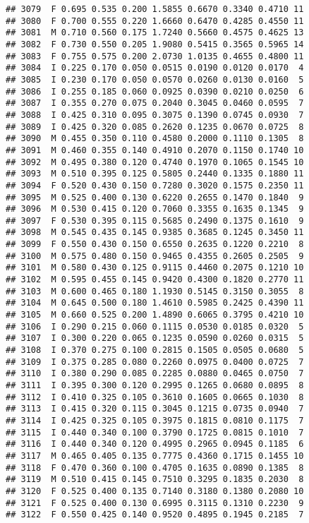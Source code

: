 \documentclass[
]{article}
\begin{document}
\begin{verbatim}
## 3079  F 0.695 0.535 0.200 1.5855 0.6670 0.3340 0.4710 11
## 3080  F 0.700 0.555 0.220 1.6660 0.6470 0.4285 0.4550 11
## 3081  M 0.710 0.560 0.175 1.7240 0.5660 0.4575 0.4625 13
## 3082  F 0.730 0.550 0.205 1.9080 0.5415 0.3565 0.5965 14
## 3083  F 0.755 0.575 0.200 2.0730 1.0135 0.4655 0.4800 11
## 3084  I 0.225 0.170 0.050 0.0515 0.0190 0.0120 0.0170  4
## 3085  I 0.230 0.170 0.050 0.0570 0.0260 0.0130 0.0160  5
## 3086  I 0.255 0.185 0.060 0.0925 0.0390 0.0210 0.0250  6
## 3087  I 0.355 0.270 0.075 0.2040 0.3045 0.0460 0.0595  7
## 3088  I 0.425 0.310 0.095 0.3075 0.1390 0.0745 0.0930  7
## 3089  I 0.425 0.320 0.085 0.2620 0.1235 0.0670 0.0725  8
## 3090  M 0.455 0.350 0.110 0.4580 0.2000 0.1110 0.1305  8
## 3091  M 0.460 0.355 0.140 0.4910 0.2070 0.1150 0.1740 10
## 3092  M 0.495 0.380 0.120 0.4740 0.1970 0.1065 0.1545 10
## 3093  M 0.510 0.395 0.125 0.5805 0.2440 0.1335 0.1880 11
## 3094  F 0.520 0.430 0.150 0.7280 0.3020 0.1575 0.2350 11
## 3095  M 0.525 0.400 0.130 0.6220 0.2655 0.1470 0.1840  9
## 3096  M 0.530 0.415 0.120 0.7060 0.3355 0.1635 0.1345  9
## 3097  F 0.530 0.395 0.115 0.5685 0.2490 0.1375 0.1610  9
## 3098  M 0.545 0.435 0.145 0.9385 0.3685 0.1245 0.3450 11
## 3099  F 0.550 0.430 0.150 0.6550 0.2635 0.1220 0.2210  8
## 3100  M 0.575 0.480 0.150 0.9465 0.4355 0.2605 0.2505  9
## 3101  M 0.580 0.430 0.125 0.9115 0.4460 0.2075 0.1210 10
## 3102  M 0.595 0.455 0.145 0.9420 0.4300 0.1820 0.2770 11
## 3103  M 0.600 0.465 0.180 1.1930 0.5145 0.3150 0.3055  8
## 3104  M 0.645 0.500 0.180 1.4610 0.5985 0.2425 0.4390 11
## 3105  M 0.660 0.525 0.200 1.4890 0.6065 0.3795 0.4210 10
## 3106  I 0.290 0.215 0.060 0.1115 0.0530 0.0185 0.0320  5
## 3107  I 0.300 0.220 0.065 0.1235 0.0590 0.0260 0.0315  5
## 3108  I 0.370 0.275 0.100 0.2815 0.1505 0.0505 0.0680  5
## 3109  I 0.375 0.285 0.080 0.2260 0.0975 0.0400 0.0725  7
## 3110  I 0.380 0.290 0.085 0.2285 0.0880 0.0465 0.0750  7
## 3111  I 0.395 0.300 0.120 0.2995 0.1265 0.0680 0.0895  8
## 3112  I 0.410 0.325 0.105 0.3610 0.1605 0.0665 0.1030  8
## 3113  I 0.415 0.320 0.115 0.3045 0.1215 0.0735 0.0940  7
## 3114  I 0.425 0.325 0.105 0.3975 0.1815 0.0810 0.1175  7
## 3115  I 0.440 0.340 0.100 0.3790 0.1725 0.0815 0.1010  7
## 3116  I 0.440 0.340 0.120 0.4995 0.2965 0.0945 0.1185  6
## 3117  M 0.465 0.405 0.135 0.7775 0.4360 0.1715 0.1455 10
## 3118  F 0.470 0.360 0.100 0.4705 0.1635 0.0890 0.1385  8
## 3119  M 0.510 0.415 0.145 0.7510 0.3295 0.1835 0.2030  8
## 3120  F 0.525 0.400 0.135 0.7140 0.3180 0.1380 0.2080 10
## 3121  F 0.525 0.400 0.130 0.6995 0.3115 0.1310 0.2230  9
## 3122  F 0.550 0.425 0.140 0.9520 0.4895 0.1945 0.2185  7

\end{verbatim}
\end{document}
